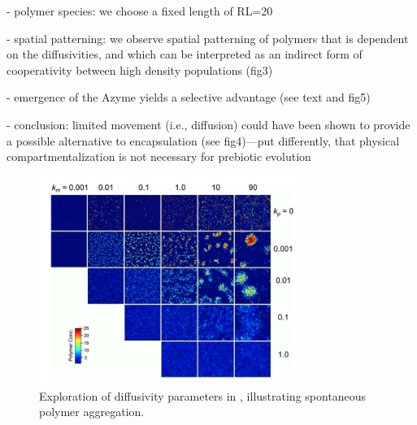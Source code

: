 \documentclass[11pt]{article}
\begin{document}
\begin{markdown}
- polymer species: we choose a fixed length of RL=20
    
- spatial patterning: we observe spatial patterning of polymers that is dependent on the diffusivities, and which can be interpreted as an indirect form of cooperativity between high density populations (fig3)
    
- emergence of the Azyme yields a selective advantage (see text and fig5)
    
- conclusion: limited movement (i.e., diffusion) could have been shown to provide a possible alternative to encapsulation (see fig4)—put differently, that physical compartmentalization is not necessary for prebiotic evolution
    
\end{markdown}

\begin{figure}[hbt]
  \centering
  \includegraphics[width=0.75\textwidth]{figures/walker2012/fig3.png}
  \caption{Exploration of diffusivity parameters in \cite{walker_universal_2012}, illustrating spontaneous polymer aggregation.}
  \label{fig:walker2012fig3}
\end{figure}


\clearpage

\subsubsection{\texorpdfstring{\cite{fontana_what_1994}}{}}
\end{document}
